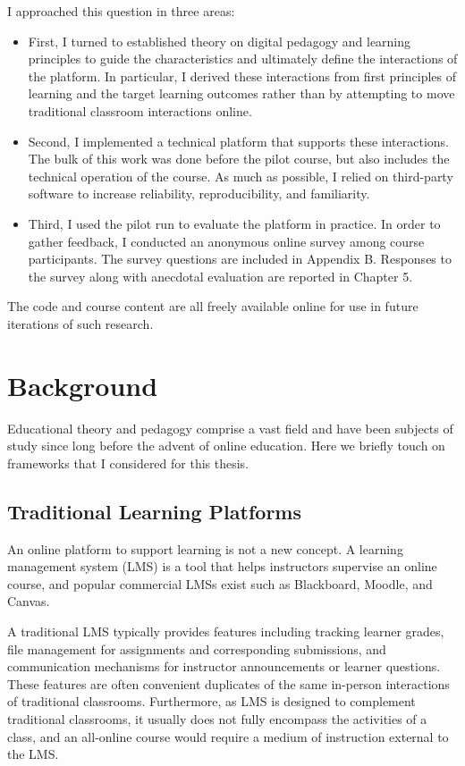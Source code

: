 \documentclass[12pt,twoside]{mitthesis}
\begin{document}
I approached this question in three areas:
\begin{itemize}
\item First, I turned to established theory on digital pedagogy and learning principles to guide the characteristics and ultimately define the interactions of the platform. In particular, I derived these interactions from first principles of learning and the target learning outcomes rather than by attempting to move traditional classroom interactions online.
\item Second, I implemented a technical platform that supports these interactions. The bulk of this work was done before the pilot course, but also includes the technical operation of the course. As much as possible, I relied on third-party software to increase reliability, reproducibility, and familiarity.
\item Third, I used the pilot run to evaluate the platform in practice. In order to gather feedback, I conducted an anonymous online survey among course participants. The survey questions are included in Appendix B. Responses to the survey along with anecdotal evaluation are reported in Chapter 5.
\end{itemize}

The code and course content are all freely available online for use in future iterations of such research.~\cite{rla}

\chapter{Background}

Educational theory and pedagogy comprise a vast field and have been subjects of study since long before the advent of online education. Here we briefly touch on frameworks that I considered for this thesis. 

\section{Traditional Learning Platforms}

An online platform to support learning is not a new concept. A learning management system (LMS) is a tool that helps instructors supervise an online course, and popular commercial LMSs exist such as Blackboard, Moodle, and Canvas. 

A traditional LMS typically provides features including tracking learner grades, file management for assignments and corresponding submissions, and communication mechanisms for instructor announcements or learner questions. These features are often convenient duplicates of the same in-person interactions of traditional classrooms. Furthermore, as LMS is designed to complement traditional classrooms, it usually does not fully encompass the activities of a class, and an all-online course would require a medium of instruction external to the LMS.~\cite{zagalsky2015emergence}
\end{document}
